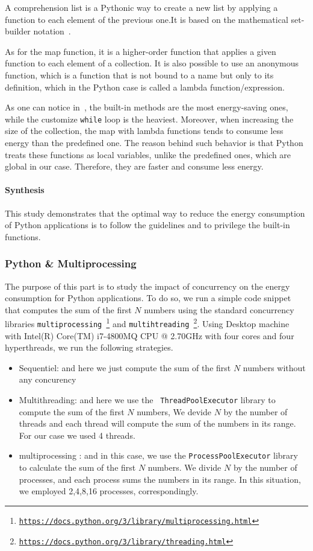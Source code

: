 A comprehension list is a Pythonic way to create a new list by applying a function to each element of the previous one.It is based on the mathematical set-builder notation~\cite{editiondiscrete}.

As for the map function, it is a higher-order function that applies a given function to each element of a collection. It is also possible to use an anonymous function, which is a function that is not bound to a name but only to its definition, which in the Python case is called a lambda function/expression.

As one can notice in~, the built-in methods are the most energy-saving ones, while the customize \texttt{while} loop is the heaviest.
Moreover, when increasing the size of the collection, the map with lambda functions tends to consume less energy than the predefined one.
The reason behind such behavior is that Python treats these functions as local variables, unlike the predefined ones, which are global in our case. Therefore, they are faster and consume less energy.


\paragraph*{Synthesis}
This study demonstrates that the optimal way to reduce the energy consumption of Python applications is to follow the guidelines and to privilege the built-in functions.


\subsubsection{Python \& Multiprocessing}
The purpose of this part is to study the impact of concurrency on the energy consumption for Python applications.
To do so, we run a simple code snippet that computes the sum of the first $N$ numbers using the standard concurrency libraries \texttt{multiprocessing~\footnote{\url{https://docs.python.org/3/library/multiprocessing.html}}} and \texttt{multihtreading~\footnote{\url{https://docs.python.org/3/library/threading.html}}}. Using Desktop  machine with Intel(R) Core(TM) i7-4800MQ CPU @ 2.70GHz with four cores and four hyperthreads, we run the following strategies.
\begin{itemize}
    \item Sequentiel: and here we just compute the sum of the first $N$ numbers without any concurency
    \item Multithreading: and here we use the \texttt{ ThreadPoolExecutor} library to compute the sum of the first $N$ numbers, We devide $N$ by the number of threads and each thread will compute the sum of the numbers in its range. For our case we used 4 threads.
    \item multiprocessing : and in this case, we use the \texttt{ProcessPoolExecutor} library to calculate the sum of the first $N$ numbers. We divide $N$ by the number of processes, and each process sums the numbers in its range. In this situation, we employed 2,4,8,16 processes, correspondingly.
\end{itemize}



